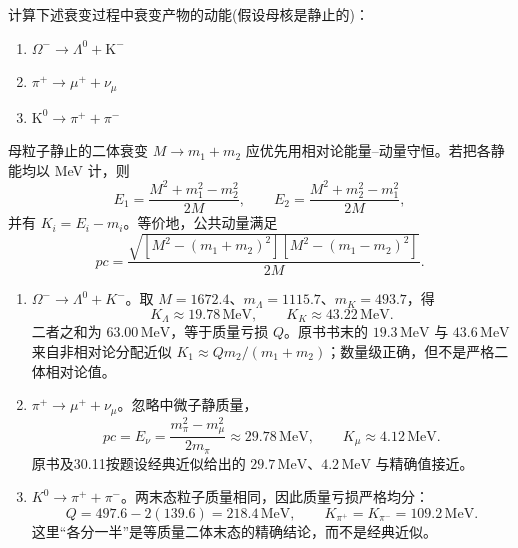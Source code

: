 \begin{exercise}\label{ex:30.13}
计算下述衰变过程中衰变产物的动能(假设母核是静止的)：
\begin{enumerate}
  \item[(a)] $\Omega^- \rightarrow \Lambda^0 + \mathrm{K}^-$
  \item[(b)] $\pi^+ \rightarrow \mu^+ + \nu_\mu$
  \item[(c)] $\mathrm{K}^0 \rightarrow \pi^+ + \pi^-$
\end{enumerate}
\end{exercise}
\begin{solution}
母粒子静止的二体衰变 $M\to m_1+m_2$ 应优先用相对论能量--动量守恒。若把各静能均以 MeV 计，则
\[
E_1=\frac{M^2+m_1^2-m_2^2}{2M},\qquad
E_2=\frac{M^2+m_2^2-m_1^2}{2M},
\]
并有 $K_i=E_i-m_i$。等价地，公共动量满足
\[
pc=\frac{\sqrt{[M^2-(m_1+m_2)^2][M^2-(m_1-m_2)^2]}}{2M}.
\]
\begin{enumerate}
\item[(a)] $\Omega^-\to\Lambda^0+K^-$。取
$M=1672.4$、$m_\Lambda=1115.7$、$m_K=493.7$，得
\[
\boxed{K_\Lambda\approx19.78\,\mathrm{MeV}},\qquad
\boxed{K_K\approx43.22\,\mathrm{MeV}}.
\]
二者之和为 $63.00\,\mathrm{MeV}$，等于质量亏损 $Q$。原书书末的 $19.3\,\mathrm{MeV}$ 与 $43.6\,\mathrm{MeV}$ 来自非相对论分配近似
$K_1\approx Qm_2/(m_1+m_2)$；数量级正确，但不是严格二体相对论值。

\item[(b)] $\pi^+\to\mu^++\nu_\mu$。忽略中微子静质量，
\[
pc=E_\nu=\frac{m_\pi^2-m_\mu^2}{2m_\pi}\approx29.78\,\mathrm{MeV},
\qquad
\boxed{K_\mu\approx4.12\,\mathrm{MeV}}.
\]
原书及30.11按题设经典近似给出的 $29.7\,\mathrm{MeV}$、$4.2\,\mathrm{MeV}$ 与精确值接近。

\item[(c)] $K^0\to\pi^++\pi^-$。两末态粒子质量相同，因此质量亏损严格均分：
\[
Q=497.6-2(139.6)=218.4\,\mathrm{MeV},\qquad
\boxed{K_{\pi^+}=K_{\pi^-}=109.2\,\mathrm{MeV}}.
\]
这里“各分一半”是等质量二体末态的精确结论，而不是经典近似。
\end{enumerate}
\end{solution}

